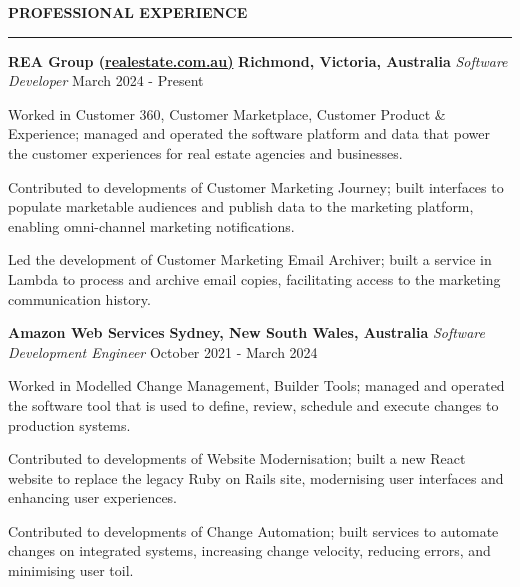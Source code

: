\documentclass{cv}
\begin{document}
\textbf{\uppercase{Professional Experience}}
\sectionlineskip
\hrule height 0.6pt
\begin{list}{}{\setlength{\leftmargin}{0pt}}
\itemsep 2.0pt
\item
    \textbf{REA Group (\href{https://realestate.com.au/}{realestate.com.au)}} \hfill \textbf{Richmond, Victoria, Australia}%
    \vspace{1.0pt} \newline 
    {\textit{Software Developer}} \hfill {March 2024 - Present}%
    \begin{list}{\raisebox{2.0pt}{\tiny$\bullet$}\space}{\setlength{\leftmargin}{11.2pt}}
        \itemsep -4.0pt \vspace{-4.0pt}
        \item Worked in Customer 360, Customer Marketplace, Customer Product \& Experience; managed and operated the software platform and data that power the customer experiences for real estate agencies and businesses.
        \item Contributed to developments of Customer Marketing Journey; built interfaces to populate marketable audiences and publish data to the marketing platform, enabling omni-channel marketing notifications.
        \item Led the development of Customer Marketing Email Archiver; built a service in Lambda to process and archive email copies, facilitating access to the marketing communication history.
    \end{list}
\item 
    \textbf{Amazon Web Services} \hfill \textbf{Sydney, New South Wales, Australia}%
    \vspace{1.0pt} \newline 
    {\textit{Software Development Engineer}} \hfill {October 2021 - March 2024}%
    \begin{list}{\raisebox{2.0pt}{\tiny$\bullet$}\space}{\setlength{\leftmargin}{11.2pt}}
        \itemsep -4.0pt \vspace{-4.0pt}
        \item Worked in Modelled Change Management, Builder Tools; managed and operated the software tool that is used to define, review, schedule and execute changes to production systems.
        \item Contributed to developments of Website Modernisation; built a new React website to replace the legacy Ruby on Rails site, modernising user interfaces and enhancing user experiences.
        \item Contributed to developments of Change Automation; built services to automate changes on integrated systems, increasing change velocity, reducing errors, and minimising user toil.

\end{list}
\end{list}
\end{document}
